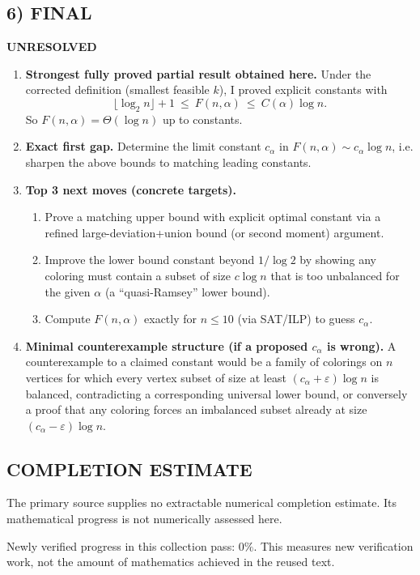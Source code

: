\subsection*{6) FINAL}
\textbf{UNRESOLVED}

\begin{enumerate}
\item[(i)] \textbf{Strongest fully proved partial result obtained here.}
Under the corrected definition (smallest feasible $k$), I proved explicit constants with
\[
\lfloor\log_2 n\rfloor+1\ \le\ F(n,\alpha)\ \le\ C(\alpha)\log n.
\]
So $F(n,\alpha)=\Theta(\log n)$ up to constants.

\item[(ii)] \textbf{Exact first gap.}
Determine the limit constant $c_{\alpha}$ in $F(n,\alpha)\sim c_{\alpha}\log n$, i.e. sharpen the above bounds to matching leading constants.

\item[(iii)] \textbf{Top 3 next moves (concrete targets).}
\begin{enumerate}
\item Prove a matching upper bound with explicit optimal constant via a refined large-deviation+union bound (or second moment) argument.
\item Improve the lower bound constant beyond $1/\log 2$ by showing any coloring must contain a subset of size $c\log n$ that is too unbalanced for the given $\alpha$ (a ``quasi-Ramsey'' lower bound).
\item Compute $F(n,\alpha)$ exactly for $n\le 10$ (via SAT/ILP) to guess $c_{\alpha}$.
\end{enumerate}

\item[(iv)] \textbf{Minimal counterexample structure (if a proposed $c_{\alpha}$ is wrong).}
A counterexample to a claimed constant would be a family of colorings on $n$ vertices for which every vertex subset of size at least $(c_{\alpha}+\varepsilon)\log n$ is balanced, contradicting a corresponding universal lower bound, or conversely a proof that any coloring forces an imbalanced subset already at size $(c_{\alpha}-\varepsilon)\log n$.
\end{enumerate}




\subsection*{COMPLETION ESTIMATE}
The primary source supplies no extractable numerical completion estimate. Its mathematical progress is not numerically assessed here.

Newly verified progress in this collection pass: $0\%$. This measures new verification work, not the amount of mathematics achieved in the reused text.
